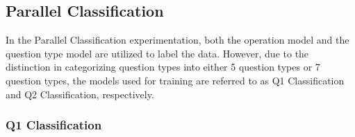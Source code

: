 \documentclass[12pt,oneside,openright,a4paper]{cpe-english-project}
\begin{document}
    \subsection{Parallel  Classification}
      \qquad In the Parallel Classification experimentation, both the operation model and the question type model are utilized to label the data. However, due to the distinction in categorizing question types into either 5 question types or 7 question types, the models used for training are referred to as Q1 Classification and Q2 Classification, respectively. \par
      \subsubsection{Q1 Classification}
        \begin{table}[H]
          \scriptsize
          \centering
          \caption{Q1 Classification with Added Normal and Augmented Experiment Result}\label{tab:Q1-Parallel}
\end{table}
\end{document}
